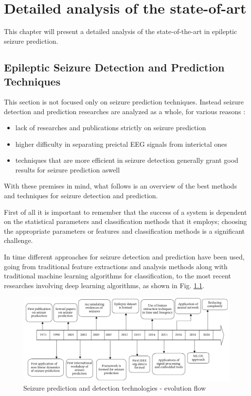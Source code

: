 \chapter{Detailed analysis of the state-of-art} \label{cpt:state-of-art}

This chapter will present a detailed analysis of the state-of-the-art in epileptic seizure prediction.

\section{Epileptic Seizure Detection and Prediction Techniques}
This section is not focused only on seizure prediction techniques. Instead seizure detection and prediction researches are analyzed as a whole, for various reasons \cite{gadhoumi_seizure_2016, bou_assi_towards_2017, natu_review_2022}:

\begin{itemize}
    \item lack of researches and publications strictly on seizure prediction 
    \item higher difficulty in separating preictal \gls{EEG} signals from interictal ones
    \item techniques that are more efficient in seizure detection generally grant good results for seizure prediction aswell
\end{itemize}

With these premises in mind, what follows is an overview of the best methods and techniques for seizure detection and prediction.

First of all it is important to remember that the success of a system is dependent on the statistical parameters and classification methods that it employs; choosing the appropriate parameters or features and classification methods is a significant challenge.

In time different approaches for seizure detection and prediction have been used, going from traditional feature extractions and analysis methods along with traditional machine learning algorithms for classification, to the most recent researches involving deep learning algorithms, as shown in Fig. \ref{fig:seizure-prediction-evolution-flow}.

\begin{figure}[ht]
    \centering
    \includegraphics[width=1.0\textwidth]{images/State-of-art/seizure-prediction-evolution-flow.png}
    \caption{Seizure prediction and detection technologies - evolution flow \cite{natu_review_2022}}
    \label{fig:seizure-prediction-evolution-flow}
\end{figure}

